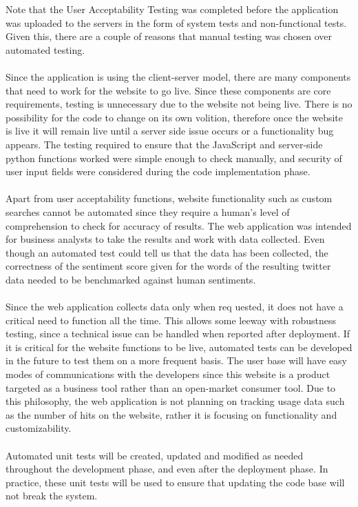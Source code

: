 \documentclass[12pt]{article}
\begin{document}
Note that the User Acceptability Testing was completed before the application was uploaded to the servers in the form of system tests and non-functional tests. Given this, there are a couple of reasons that manual testing was chosen over automated testing. 
\\ \\
Since the application is using the client-server model, there are many components that need to work for the website to go live. Since these components are core requirements, testing is unnecessary due to the website not being live. There is no possibility for the code to change on its own volition, therefore once the website is live it will remain live until a server side issue occurs or a functionality bug appears. The testing required to ensure that the JavaScript and server-side python functions worked were simple enough to check manually, and security of user input fields were considered during the code implementation phase.
\\ \\
Apart from user acceptability functions, website functionality such as custom searches cannot be automated since they require a human's level of comprehension to check for accuracy of results. The web application was intended for business analysts to take the results and work with data collected. Even though an automated test could tell us that the data has been collected, the correctness of the sentiment score given for the words of the resulting twitter data needed to be benchmarked against human sentiments.
\\ \\
Since the web application collects data only when req	uested, it does not have a critical need to function all the time. This allows some leeway with robustness testing, since a technical issue can be handled when reported after deployment. If it is critical for the website functions to be live, automated tests can be developed in the future to test them on a more frequent basis. The user base will have easy modes of communications with the developers since this website is a product targeted as a business tool rather than an open-market consumer tool. Due to this philosophy, the web application is not planning on tracking usage data such as the number of hits on the website, rather it is focusing on functionality and customizability. 
\\ \\
Automated unit tests will be created, updated and modified as needed throughout the development phase, and even after the deployment phase. In practice, these unit tests will be used to ensure that updating the code base will not break the system.
\end{document}
